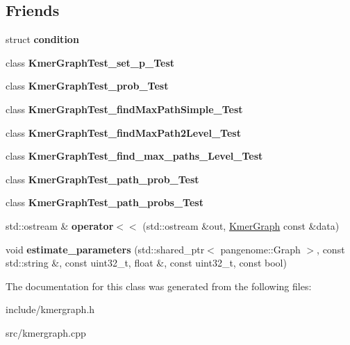 \subsection*{Friends}
\begin{DoxyCompactItemize}
\item 
\mbox{\label{classKmerGraph_ab27a87abadfae7a133147398c76b360e}} 
struct {\bfseries condition}
\item 
\mbox{\label{classKmerGraph_adeaf601190c324a285c2940a74aeb9e1}} 
class {\bfseries Kmer\+Graph\+Test\+\_\+set\+\_\+p\+\_\+\+Test}
\item 
\mbox{\label{classKmerGraph_ad9f28c71a60091bf27674340221a66b3}} 
class {\bfseries Kmer\+Graph\+Test\+\_\+prob\+\_\+\+Test}
\item 
\mbox{\label{classKmerGraph_aa702f3df461a039bce047bb79072046c}} 
class {\bfseries Kmer\+Graph\+Test\+\_\+find\+Max\+Path\+Simple\+\_\+\+Test}
\item 
\mbox{\label{classKmerGraph_a5916f681128b36ad4e8bb1e4c80633df}} 
class {\bfseries Kmer\+Graph\+Test\+\_\+find\+Max\+Path2\+Level\+\_\+\+Test}
\item 
\mbox{\label{classKmerGraph_ac2b466ba7568647d892409fef299735d}} 
class {\bfseries Kmer\+Graph\+Test\+\_\+find\+\_\+max\+\_\+paths\+\_\+Level\+\_\+\+Test}
\item 
\mbox{\label{classKmerGraph_a37a30756770bc16926628dbc9da996ab}} 
class {\bfseries Kmer\+Graph\+Test\+\_\+path\+\_\+prob\+\_\+\+Test}
\item 
\mbox{\label{classKmerGraph_a381146f303da371b53919653c7b11793}} 
class {\bfseries Kmer\+Graph\+Test\+\_\+path\+\_\+probs\+\_\+\+Test}
\item 
\mbox{\label{classKmerGraph_abe10212267df925d60d7f580d389d0cc}} 
std\+::ostream \& {\bfseries operator$<$$<$} (std\+::ostream \&out, \hyperlink{classKmerGraph}{Kmer\+Graph} const \&data)
\item 
\mbox{\label{classKmerGraph_adef570b8b569c564dfe5e5a6a085014b}} 
void {\bfseries estimate\+\_\+parameters} (std\+::shared\+\_\+ptr$<$ pangenome\+::\+Graph $>$, const std\+::string \&, const uint32\+\_\+t, float \&, const uint32\+\_\+t, const bool)
\end{DoxyCompactItemize}


The documentation for this class was generated from the following files\+:\begin{DoxyCompactItemize}
\item 
include/kmergraph.\+h\item 
src/kmergraph.\+cpp\end{DoxyCompactItemize}
